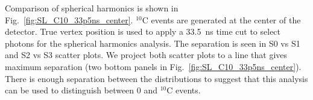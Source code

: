 Comparison of spherical harmonics is shown in
Fig.~\ref{fig:SL_C10_33p5ns_center}. $^{10}$C events are generated at
the center of the detector. True vertex position is used to apply a
33.5~ns time cut to select photons for the spherical harmonics
analysis. The separation is seen in S0 vs S1 and S2 vs S3 scatter
plots. We project both scatter plots to a line that gives maximum
separation (two bottom panels in Fig.~\ref{fig:SL_C10_33p5ns_center}).  
There is enough separation between the distributions to suggest that this analysis can be used to distinguish between 0{\nbb} and $^{10}$C events.

